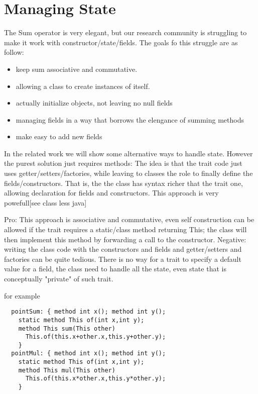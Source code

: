 \documentclass{llncs}
\begin{document}
\section{Managing State}

The Sum operator is very elegant, but our research community is struggling to
make it work with constructor/state/fields.
The goals fo this struggle are as follow:

\begin{itemize}

\item keep sum associative and commutative.
\item allowing a class to create instances of itself.
\item actually initialize objects, not leaving no null fields
\item managing fields in a way that borrows the elengance of summing methods
\item make easy to add new fields

\end{itemize}

In the related work we will show some alternative ways to handle state.
However the purest solution just requires methods:
  The idea is that
  the trait code just uses getter/setters/factories, while leaving
  to classes the role to finally define the fields/constructors.
  That is, the  the class has syntax richer that the trait one,
  allowing declaration for fields and constructors.
  This approach is very powefull[see class less java]
 
  Pro: This approach is associative and commutative, even self construction
  can be allowed if the trait requires a static/class method
  returning This; the class will then implement this method by forwarding
  a call to the constructor.
  Negative: writing the class code with the constructors and
   fields and getter/setters and factories can be quite tedious.
   There is no way for a trait to specify a default value for a field,
   the class need to handle all the state, even state that is conceptually
   "private" of such trait.

  for example 

\begin{lstlisting}
  pointSum: { method int x(); method int y();
    static method This of(int x,int y);
    method This sum(This other)
      This.of(this.x+other.x,this.y+other.y);
    }
  pointMul: { method int x(); method int y();
    static method This of(int x,int y);
    method This mul(This other)
      This.of(this.x*other.x,this.y*other.y);
    }
\end{lstlisting}
\end{document}
